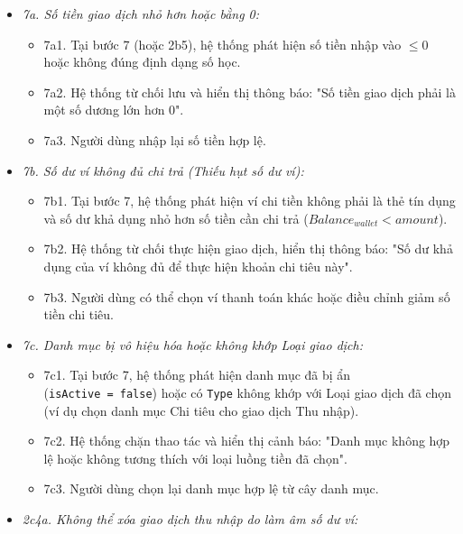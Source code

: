 \documentclass[11pt,a4paper]{article}
\providecommand{\tightlist}{
  \setlength{\itemsep}{0pt}\setlength{\parskip}{0pt}}
\begin{document}
\begin{itemize}
  \begin{itemize}
  \tightlist
  \item
    \emph{7a. Số tiền giao dịch nhỏ hơn hoặc bằng 0:}

    \begin{itemize}
    \tightlist
    \item
      7a1. Tại bước 7 (hoặc 2b5), hệ thống phát hiện số tiền nhập vào
      \(\le 0\) hoặc không đúng định dạng số học.
    \item
      7a2. Hệ thống từ chối lưu và hiển thị thông báo: "Số tiền giao
      dịch phải là một số dương lớn hơn 0".
    \item
      7a3. Người dùng nhập lại số tiền hợp lệ.
    \end{itemize}
  \item
    \emph{7b. Số dư ví không đủ chi trả (Thiếu hụt số dư ví):}

    \begin{itemize}
    \tightlist
    \item
      7b1. Tại bước 7, hệ thống phát hiện ví chi tiền không phải là thẻ
      tín dụng và số dư khả dụng nhỏ hơn số tiền cần chi trả
      (\(Balance_{wallet} < amount\)).
    \item
      7b2. Hệ thống từ chối thực hiện giao dịch, hiển thị thông báo: "Số
      dư khả dụng của ví không đủ để thực hiện khoản chi tiêu này".
    \item
      7b3. Người dùng có thể chọn ví thanh toán khác hoặc điều chỉnh
      giảm số tiền chi tiêu.
    \end{itemize}
  \item
    \emph{7c. Danh mục bị vô hiệu hóa hoặc không khớp Loại giao dịch:}

    \begin{itemize}
    \tightlist
    \item
      7c1. Tại bước 7, hệ thống phát hiện danh mục đã bị ẩn
      (\texttt{isActive\ =\ false}) hoặc có \texttt{Type} không khớp với
      Loại giao dịch đã chọn (ví dụ chọn danh mục Chi tiêu cho giao dịch
      Thu nhập).
    \item
      7c2. Hệ thống chặn thao tác và hiển thị cảnh báo: "Danh mục không
      hợp lệ hoặc không tương thích với loại luồng tiền đã chọn".
    \item
      7c3. Người dùng chọn lại danh mục hợp lệ từ cây danh mục.
    \end{itemize}
  \item
    \emph{2c4a. Không thể xóa giao dịch thu nhập do làm âm số dư ví:}


\end{itemize}
\end{itemize}
\end{document}
